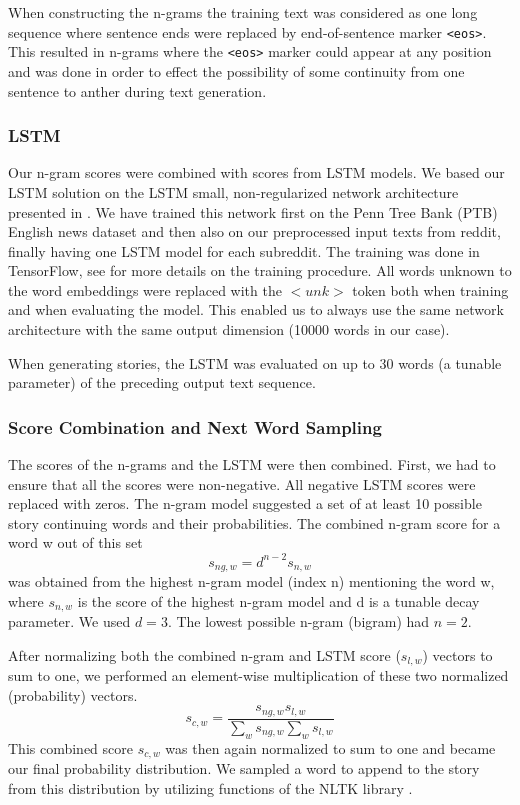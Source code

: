 \documentclass[12pt,a4paper,utf8]{article}
\begin{document}
When constructing the n-grams the training text was considered as one long sequence where sentence ends were replaced by end-of-sentence marker \texttt{<eos>}. This resulted in n-grams where the \texttt{<eos>} marker could appear at any position and was done in order to effect the possibility of some continuity from one sentence to anther during text generation.

\subsubsection{LSTM}\label{sec:methodlstm}
Our n-gram scores were combined with scores from LSTM models. We based our LSTM solution on the LSTM small, non-regularized network architecture presented in \cite{Zaremba14}. We have trained this network first on the Penn Tree Bank (PTB) English news dataset \cite{PTB} and then also on our preprocessed input texts from reddit, finally having one LSTM model for each subreddit. The training was done in TensorFlow, see \cite{TensorFlow} for more details on the training procedure. All words unknown to the word embeddings were replaced with the $<unk>$ token both when training and when evaluating the model. This enabled us to always use the same network architecture with the same output dimension (10000 words in our case).

When generating stories, the LSTM was evaluated on up to 30 words (a tunable parameter) of the preceding output text sequence. 

\subsubsection{Score Combination and Next Word Sampling}
The scores of the n-grams and the LSTM were then combined. First, we had to ensure that all the scores were non-negative. All negative LSTM scores were replaced with zeros. The n-gram model suggested a set of at least 10 possible story continuing words and their probabilities. The combined n-gram score for a word w out of this set
\begin{equation}
s_{ng,w}= d^{n-2} s_{n,w}
\end{equation}
was obtained from the highest n-gram model (index n) mentioning the word w, where $s_{n,w}$ is the score of the highest n-gram model and d is a tunable decay parameter. We used $d=3$. The lowest possible n-gram (bigram) had $n=2$.

After normalizing both the combined n-gram and LSTM score ($s_{l,w}$) vectors to sum to one, we performed an element-wise multiplication of these two normalized (probability) vectors.
\begin{equation}
s_{c,w}= \frac{s_{ng,w} s_{l,w}}{\sum_w{s_{ng,w}} \sum_w{s_{l,w}}}
\end{equation}
This combined score $s_{c,w}$ was then again normalized to sum to one and became our final probability distribution. We sampled a word to append to the story from this distribution by utilizing functions of the NLTK library \cite{NLTK}.
\end{document}
